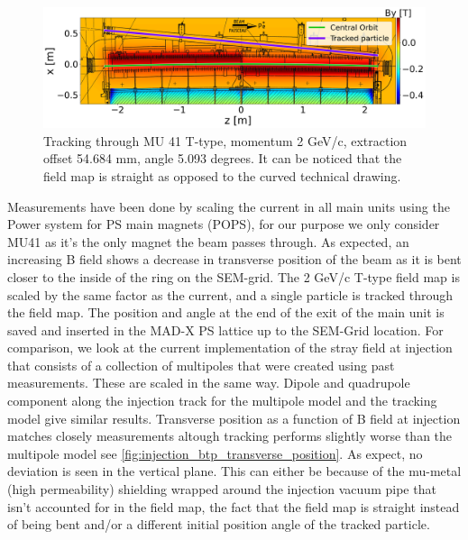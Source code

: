 \documentclass[a4paper,
               biblatex,     %
               keeplastbox,   %
               ]{jacow}
\begin{document}
\begin{figure}[!htb]
   \centering
   \includegraphics*[width=1.0\columnwidth]{injection_btp.png}
   \caption{Tracking through MU 41 T-type, momentum 2 GeV/c, extraction offset 54.684 mm, angle 5.093 degrees. It can be noticed that the field map is straight as opposed to the curved technical drawing.}
   \label{fig:injection_btp}
\end{figure}

Measurements have been done by scaling the current in all main units using the Power system for PS main magnets (POPS), for our purpose we only consider MU41 as it's the only magnet the beam passes through. As expected, an increasing B field shows a decrease in transverse position of the beam as it is bent closer to the inside of the ring on the SEM-grid. The 2 GeV/c T-type field map is scaled by the same factor as the current, and a single particle is tracked through the field map. The position and angle at the end of the exit of the main unit is saved and inserted in the MAD-X PS lattice up to the SEM-Grid location. For comparison, we look at the current implementation of the stray field at injection that consists of a collection of multipoles that were created using past measurements. These are scaled in the same way. Dipole and quadrupole component along the injection track for the multipole model and the tracking model give similar results. Transverse position as a function of B field at injection matches closely measurements altough tracking performs slightly worse than the multipole model see \ref{fig:injection_btp_transverse_position}. As expect, no deviation is seen in the vertical plane. This can either be because of the mu-metal (high permeability) shielding wrapped around the injection vacuum pipe that isn't accounted for in the field map, the fact that the field map is straight instead of being bent and/or a different initial position angle of the tracked particle.
\end{document}
